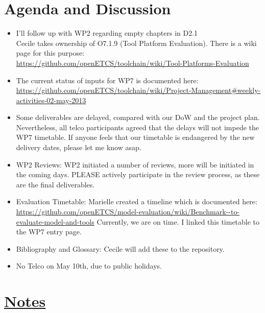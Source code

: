 \documentclass[a4paper, 11pt]{article}
\begin{document}
\section{Agenda and Discussion}
\begin{itemize}

\item I'll follow up with WP2 regarding empty chapters in D2.1 \\
Cecile takes ownership of O7.1.9 (Tool Platform Evaluation).
There is a wiki page for this purpose:\\
\url{https://github.com/openETCS/toolchain/wiki/Tool-Platforms-Evaluation}\\

\item The current status of inputs for WP7 is documented here:\\
\url{https://github.com/openETCS/toolchain/wiki/Project-Management\#weekly-activities-02-may-2013}

\item Some deliverables are delayed, compared with our DoW and the project plan.  Nevertheless, all telco participants agreed that the delays will not impede the WP7 timetable. If anyone feels that our timetable is endangered by the new delivery dates, please let me know asap.\\

\item WP2 Reviews: WP2 initiated a number of reviews, more will be initiated in the coming days.  PLEASE actively participate in the review process, as these are the final deliverables.\\

\item Evaluation Timetable: Marielle created a timeline which is documented here:\\
\url{https://github.com/openETCS/model-evaluation/wiki/Benchmark--to-evaluate-model-and-tools}
Currently, we are on time.  I linked this timetable to the WP7 entry page.\\

\item Bibliography and Glossary: Cecile will add these to the repository.\\

\item No Telco on May 10th, due to public holidays.

\end{itemize}

\section{\underline{Notes}}
\end{document}
